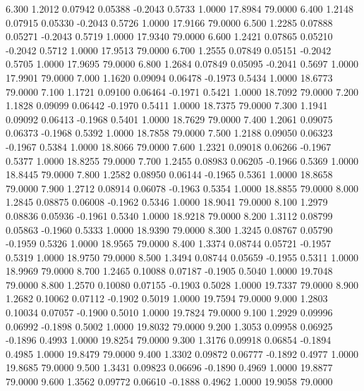    6.300   1.2012   0.07942   0.05388  -0.2043   0.5733   1.0000  17.8984  79.0000
   6.400   1.2148   0.07915   0.05330  -0.2043   0.5726   1.0000  17.9166  79.0000
   6.500   1.2285   0.07888   0.05271  -0.2043   0.5719   1.0000  17.9340  79.0000
   6.600   1.2421   0.07865   0.05210  -0.2042   0.5712   1.0000  17.9513  79.0000
   6.700   1.2555   0.07849   0.05151  -0.2042   0.5705   1.0000  17.9695  79.0000
   6.800   1.2684   0.07849   0.05095  -0.2041   0.5697   1.0000  17.9901  79.0000
   7.000   1.1620   0.09094   0.06478  -0.1973   0.5434   1.0000  18.6773  79.0000
   7.100   1.1721   0.09100   0.06464  -0.1971   0.5421   1.0000  18.7092  79.0000
   7.200   1.1828   0.09099   0.06442  -0.1970   0.5411   1.0000  18.7375  79.0000
   7.300   1.1941   0.09092   0.06413  -0.1968   0.5401   1.0000  18.7629  79.0000
   7.400   1.2061   0.09075   0.06373  -0.1968   0.5392   1.0000  18.7858  79.0000
   7.500   1.2188   0.09050   0.06323  -0.1967   0.5384   1.0000  18.8066  79.0000
   7.600   1.2321   0.09018   0.06266  -0.1967   0.5377   1.0000  18.8255  79.0000
   7.700   1.2455   0.08983   0.06205  -0.1966   0.5369   1.0000  18.8445  79.0000
   7.800   1.2582   0.08950   0.06144  -0.1965   0.5361   1.0000  18.8658  79.0000
   7.900   1.2712   0.08914   0.06078  -0.1963   0.5354   1.0000  18.8855  79.0000
   8.000   1.2845   0.08875   0.06008  -0.1962   0.5346   1.0000  18.9041  79.0000
   8.100   1.2979   0.08836   0.05936  -0.1961   0.5340   1.0000  18.9218  79.0000
   8.200   1.3112   0.08799   0.05863  -0.1960   0.5333   1.0000  18.9390  79.0000
   8.300   1.3245   0.08767   0.05790  -0.1959   0.5326   1.0000  18.9565  79.0000
   8.400   1.3374   0.08744   0.05721  -0.1957   0.5319   1.0000  18.9750  79.0000
   8.500   1.3494   0.08744   0.05659  -0.1955   0.5311   1.0000  18.9969  79.0000
   8.700   1.2465   0.10088   0.07187  -0.1905   0.5040   1.0000  19.7048  79.0000
   8.800   1.2570   0.10080   0.07155  -0.1903   0.5028   1.0000  19.7337  79.0000
   8.900   1.2682   0.10062   0.07112  -0.1902   0.5019   1.0000  19.7594  79.0000
   9.000   1.2803   0.10034   0.07057  -0.1900   0.5010   1.0000  19.7824  79.0000
   9.100   1.2929   0.09996   0.06992  -0.1898   0.5002   1.0000  19.8032  79.0000
   9.200   1.3053   0.09958   0.06925  -0.1896   0.4993   1.0000  19.8254  79.0000
   9.300   1.3176   0.09918   0.06854  -0.1894   0.4985   1.0000  19.8479  79.0000
   9.400   1.3302   0.09872   0.06777  -0.1892   0.4977   1.0000  19.8685  79.0000
   9.500   1.3431   0.09823   0.06696  -0.1890   0.4969   1.0000  19.8877  79.0000
   9.600   1.3562   0.09772   0.06610  -0.1888   0.4962   1.0000  19.9058  79.0000

